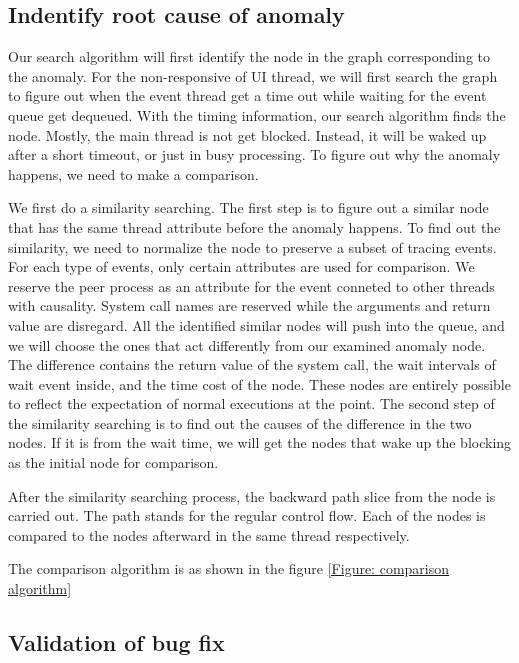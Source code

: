 \subsection{Indentify root cause of anomaly}
Our search algorithm will first identify the node in the graph corresponding to the anomaly. 
For the non-responsive of UI thread, we will first search the graph to figure out when the event thread get a time out while waiting for the event queue get dequeued.
With the timing information, our search algorithm finds the node.
Mostly, the main thread is not get blocked. Instead, it will be waked up after a short timeout, or just in busy processing.
To figure out why the anomaly happens, we need to make a comparison.

We first do a similarity searching.
The first step is to figure out a similar node that has the same thread attribute before the anomaly happens.
To find out the similarity, we need to normalize the node to preserve a subset of tracing events.
For each type of events, only certain attributes are used for comparison.
We reserve the peer process as an attribute for the event conneted to other threads with causality.
System call names are reserved while the arguments and return value are disregard. 
All the identified similar nodes will push into the queue, and we will choose the ones that act differently from our examined anomaly node.
The difference contains the return value of the system call, the wait intervals of wait event inside, and the time cost of the node.
These nodes are entirely possible to reflect the expectation of normal executions at the point.
The second step of the similarity searching is to find out the causes of the difference in the two nodes.
If it is from the wait time, we will get the nodes that wake up the blocking as the initial node for comparison.

After the similarity searching process, the backward path slice from the node is carried out.                           
The path stands for the regular control flow.                                                                 
Each of the nodes is compared to the nodes afterward in the same thread respectively.

The comparison algorithm is as shown in the figure \ref{Figure: comparison algorithm}
%
%
\subsection{Validation of bug fix}
